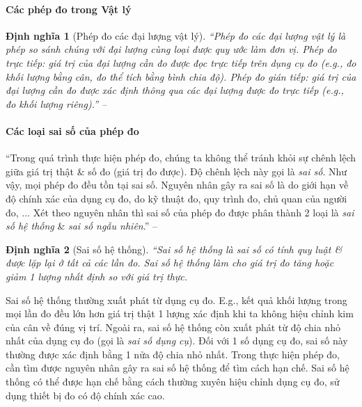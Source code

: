 \documentclass{article}
\numberwithin{equation}{section}
\newtheorem{dinhnghia}{Định nghĩa}[section]
\begin{document}
\paragraph{Các phép đo trong Vật lý}

\begin{dinhnghia}[Phép đo các đại lượng vật lý]
	``\emph{Phép đo các đại lượng vật lý} là phép so sánh chúng với đại lượng cùng loại được quy ước làm đơn vị. \emph{Phép đo trực tiếp}: giá trị của đại lượng cần đo được đọc trực tiếp trên dụng cụ đo (e.g., đo khối lượng bằng cân, đo thể tích bằng bình chia độ). \emph{Phép đo gián tiếp}: giá trị của đại lượng cần đo được xác định thông qua các đại lượng được đo trực tiếp (e.g., đo khối lượng riêng).'' -- \cite[p. 18]{SGK_Vat_Ly_10_Chan_Troi_Sang_Tao}
\end{dinhnghia}

\paragraph{Các loại sai số của phép đo}
``Trong quá trình thực hiện phép đo, chúng ta không thể tránh khỏi sự chênh lệch giữa giá trị thật \& số đo (giá trị đo được). Độ chênh lệch này gọi là \textit{sai số}. Như vậy, mọi phép đo đều tồn tại sai số. Nguyên nhân gây ra sai số là do giới hạn về độ chính xác của dụng cụ đo, do kỹ thuật đo, quy trình đo, chủ quan của người đo, $\ldots$ Xét theo nguyên nhân thì sai số của phép đo được phân thành 2 loại là \textit{sai số hệ thống} \& \textit{sai số ngẫu nhiên}.'' -- \cite[p. 19]{SGK_Vat_Ly_10_Chan_Troi_Sang_Tao}

\begin{dinhnghia}[Sai số hệ thống]
	``\emph{Sai số hệ thống} là sai số có tính quy luật \& được lặp lại ở tất cả các lần đo. Sai số hệ thống làm cho giá trị đo tăng hoặc giảm 1 lượng nhất định so với giá trị thực.
\end{dinhnghia}
Sai số hệ thống thường xuất phát từ dụng cụ đo. E.g., kết quả khối lượng trong mọi lần đo đều lớn hơn giá trị thật 1 lượng xác định khi ta không hiệu chỉnh kim của cân về đúng vị trí. Ngoài ra, sai số hệ thống còn xuất phát từ độ chia nhỏ nhất của dụng cụ đo (gọi là \textit{sai số dụng cụ}). Đối với 1 số dụng cụ đo, sai số này thường được xác định bằng 1 nửa độ chia nhỏ nhất. Trong thực hiện phép đo, cần tìm được nguyên nhân gây ra sai số hệ thống để tìm cách hạn chế. Sai số hệ thống có thể được hạn chế bằng cách thường xuyên hiệu chỉnh dụng cụ đo, sử dụng thiết bị đo có độ chính xác cao.
\end{document}
